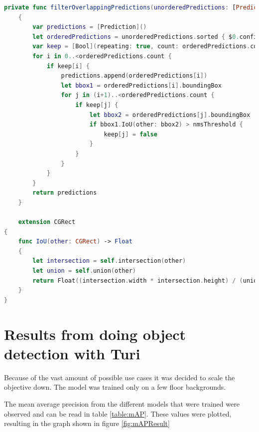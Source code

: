 \begin{lstlisting}[language=swift]
    private func filterOverlappingPredictions(unorderedPredictions: [Prediction], nmsThreshold: Float) -> [Prediction]
    {
        var predictions = [Prediction]()
        let orderedPredictions = unorderedPredictions.sorted { $0.confidence > $1.confidence }
        var keep = [Bool](repeating: true, count: orderedPredictions.count)
        for i in 0..<orderedPredictions.count {
            if keep[i] {
                predictions.append(orderedPredictions[i])
                let bbox1 = orderedPredictions[i].boundingBox
                for j in (i+1)..<orderedPredictions.count {
                    if keep[j] {
                        let bbox2 = orderedPredictions[j].boundingBox
                        if bbox1.IoU(other: bbox2) > nmsThreshold {
                            keep[j] = false
                        }
                    }
                }
            }
        }
        return predictions
    }
    
    extension CGRect
{
    func IoU(other: CGRect) -> Float
    {
        let intersection = self.intersection(other)
        let union = self.union(other)
        return Float((intersection.width * intersection.height) / (union.width * union.height))
    }
}
\end{lstlisting}

\section{Results from doing object detection with Turi}
\label{sec:turiResults}
Because of the vast amount of possible use cases it was decided to scale the objective down. The model was trained only on a few floor backgrounds. 

The mean average precision from the different models that were trained were observed and can be read in table \ref{table:mAP}. These values were plotted, resulting in the graph shown in figure \ref{fig:mAPResult}



